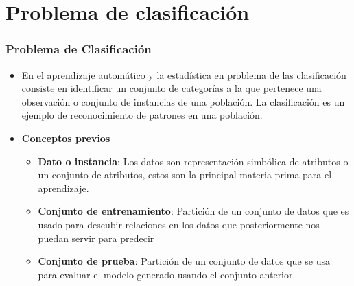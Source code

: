 \documentclass[9pt]{beamer} %
\begin{document}
\section{Problema de clasificación}
	\begin{frame}
	\frametitle{Problema de Clasificación}
		\begin{itemize}
			\item[] En el aprendizaje automático y la estadística en problema de las clasificación consiste en identificar un conjunto de categorías a la que pertenece una observación o conjunto de instancias de una población. La clasificación es un ejemplo de reconocimiento de patrones en una población. 
	
			\item[] \textbf{Conceptos previos}
	
			\begin{itemize}
				\item \textbf{Dato o instancia}: Los datos son representación simbólica de atributos o un conjunto de atributos, estos son la principal materia prima para el aprendizaje.
				\item \textbf{Conjunto de entrenamiento}:  Partición de un conjunto de datos que es usado para descubir relaciones en los datos que posteriormente nos puedan servir para predecir
				\item \textbf{Conjunto de prueba}: Partición de un conjunto de datos que se usa para evaluar el modelo generado usando el conjunto anterior.
			\end{itemize}
		\end{itemize}

	\end{frame}
			
\end{document}
